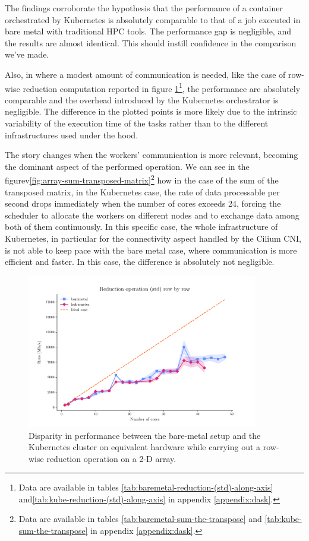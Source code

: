 The findings corroborate the hypothesis that the performance of a container
orchestrated by Kubernetes is absolutely comparable to that of a job executed in
bare metal with traditional HPC tools.
The performance gap is negligible, and the results are almost identical. This
should instill confidence in the comparison we've made.

Also, in where a modest amount of communication is needed, like the case of
row-wise reduction computation reported in figure
\ref{fig:array-reduction-std-along-axis}\footnote{
  Data are available in tables \ref{tab:baremetal-reduction-(std)-along-axis}
  and\ref{tab:kube-reduction-(std)-along-axis} in appendix \ref{appendix:dask}.
}, the performance are absolutely comparable and the overhead introduced by the
Kubernetes orchestrator is negligible. The difference in the plotted points is
more likely due to the intrinsic variability of the execution time of the tasks
rather than to the different infrastructures used under the hood.

The story changes when the workers' communication is more relevant, becoming the
dominant aspect of the performed operation.
We can see in the figurev\ref{fig:array-sum-transposed-matrix}\footnote{
  Data are available in tables \ref{tab:baremetal-sum-the-transpose} and
  \ref{tab:kube-sum-the-transpose} in appendix \ref{appendix:dask}.
} how in the case of the sum of the transposed matrix, in the Kubernetes case,
the rate of data processable per second drops immediately when the number of
cores exceeds 24, forcing the scheduler to allocate the workers on different
nodes and to exchange data among both of them continuously.
In this specific case, the whole infrastructure of Kubernetes, in particular for
the connectivity aspect handled by the Cilium CNI, is not able to keep pace with
the bare metal case, where communication is more efficient and faster.
In this case, the difference is absolutely not negligible.

\begin{figure}
  \centering
  \includegraphics[width=0.9\textwidth]{img/chpt4/array-reduction-std-along-axis}
  \caption{Disparity in performance between the bare-metal setup and the
    Kubernetes cluster on equivalent hardware while carrying out a row-wise
    reduction operation on a 2-D array.}
  \label{fig:array-reduction-std-along-axis}
\end{figure}

